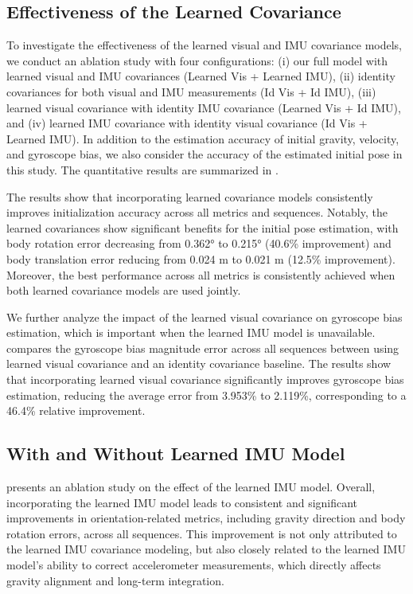 \subsection{Effectiveness of the Learned Covariance}
To investigate the effectiveness of the learned visual and IMU covariance models, we conduct an ablation study with four configurations: (i) our full model with learned visual and IMU covariances (Learned Vis + Learned IMU), (ii) identity covariances for both visual and IMU measurements (Id Vis + Id IMU), (iii) learned visual covariance with identity IMU covariance (Learned Vis + Id IMU), and (iv) learned IMU covariance with identity visual covariance (Id Vis + Learned IMU). In addition to the estimation accuracy of initial gravity, velocity, and gyroscope bias, we also consider the accuracy of the estimated initial pose in this study. The quantitative results are summarized in .

The results show that incorporating learned covariance models consistently improves initialization accuracy across all metrics and sequences. Notably, the learned covariances show significant benefits for the initial pose estimation, with body rotation error decreasing from 0.362$\si{\degree}$ to 0.215$\si{\degree}$ (40.6\% improvement) and body translation error reducing from 0.024 m to 0.021 m (12.5\% improvement).
Moreover, the best performance across all metrics is consistently achieved when both learned covariance models are used jointly. 

We further analyze the impact of the learned visual covariance on gyroscope bias estimation, which is important when the learned IMU model is unavailable.  compares the gyroscope bias magnitude error across all sequences between using learned visual covariance and an identity covariance baseline. The results show that incorporating learned visual covariance significantly improves gyroscope bias estimation, reducing the average error from 3.953\% to 2.119\%, corresponding to a 46.4\% relative improvement.


\subsection{With and Without Learned IMU Model}


 presents an ablation study on the effect of the learned IMU model. Overall, incorporating the learned IMU model leads to consistent and significant improvements in orientation-related metrics, including gravity direction and body rotation errors, across all sequences. 
This improvement is not only attributed to the learned IMU covariance modeling, but also closely related to the learned IMU model's ability to correct accelerometer measurements, which directly affects gravity alignment and long-term integration.



